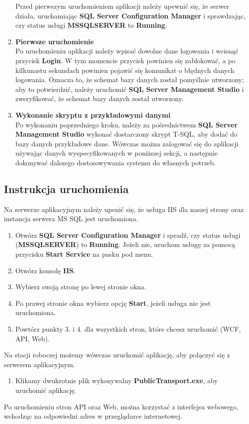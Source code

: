 \documentclass[10pt,a4paper]{article}
\begin{document}
\begin{enumerate}
	Przed pierwszym uruchomieniem aplikacji należy upewnić się, że serwer działa, uruchamiając \textbf{SQL Server Configuration Manager} i sprawdzając, czy status usługi \textbf{MSSQLSERVER} to \textbf{Running}.
	\item \textbf{Pierwsze uruchomienie} \\
	Po uruchomieniu aplikacji należy wpisać dowolne dane logowania i wcisnąć przycisk \textbf{Login}. W tym momencie przycisk powinien się zablokować, a po kilkunastu sekundach powinien pojawić się komunikat o błędnych danych logowania. Oznacza to, że schemat bazy danych został pomyślnie utworzony; aby to potwierdzić, należy uruchomić \textbf{SQL Server Management Studio} i zweryfikować, że schemat bazy danych został utworzony.
	\item \textbf{Wykonanie skryptu z przykładowymi danymi} \\
	Po wykonaniu poprzedniego kroku, należy za pośrednictwem \textbf{SQL Server Management Studio} wykonać dostarczony skrypt T-SQL, aby dodać do bazy danych przykładowe dane. Wówczas można zalogować się do aplikacji używając danych wyspecyfikowanych w poniższej sekcji, a następnie dokonywać dalszego dostosowywania systemu do własnych potrzeb.
\end{enumerate}

\subsection{Instrukcja uruchomienia}
Na serwerze aplikacyjnym należy upenić się, że usługa IIS dla naszej strony oraz instancja serwera MS SQL jest uruchomiona. 
\begin{enumerate}
	\item Otwórz \textbf{SQL Server Configuration Manager} i spradź, czy status usługi (\textbf{MSSQLSERVER}) to \textbf{Running}. Jeżeli nie, uruchom usługę za pomocą przycisku \textbf{Start Service} na pasku pod menu.
	\item Otwórz konsolę \textbf{IIS}.
	\item Wybierz swoją stronę po lewej stronie okna.
	\item Po prawej stronie okna wybierz opcję \textbf{Start}, jeżeli usługa nie jest uruchomiona.
	\item Powtórz punkty 3. i 4. dla wszystkich stron, które chcesz uruchomić (WCF, API, Web).
\end{enumerate}
Na stacji roboczej możemy wówczas uruchomić aplikację, aby połączyć się z serwerem aplikacyjnym.
\begin{enumerate}
	\item Klikamy dwukrotnie plik wykonywalny \textbf{PublicTransport.exe}, aby uruchomić aplikację.
\end{enumerate}
Po uruchomieniu stron API oraz Web, można korzystać z interfejsu webowego, wchodząc na odpowiedni adres w przeglądarce internetowej.
\end{document}
